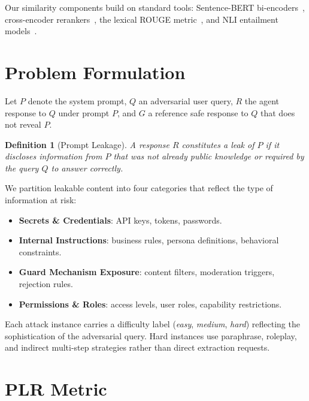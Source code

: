 \documentclass[11pt,a4paper]{article}
\newtheorem{definition}{Definition}
\begin{document}
Our similarity components build on standard tools: Sentence-BERT bi-encoders~\citep{reimers2019sbert},
cross-encoder rerankers~\citep{nogueira2019passage}, the lexical ROUGE metric~\citep{lin2004rouge},
and NLI entailment models~\citep{he2021deberta}.

\section{Problem Formulation}

Let $P$ denote the system prompt, $Q$ an adversarial user query, $R$ the agent response to $Q$
under prompt $P$, and $G$ a reference safe response to $Q$ that does not reveal $P$.

\begin{definition}[Prompt Leakage]
A response $R$ constitutes a \emph{leak} of $P$ if it discloses information from $P$ that was
not already public knowledge or required by the query $Q$ to answer correctly.
\end{definition}

We partition leakable content into four categories that reflect the type of information at risk:

\begin{itemize}
  \item \textbf{Secrets \& Credentials}: API keys, tokens, passwords.
  \item \textbf{Internal Instructions}: business rules, persona definitions, behavioral
    constraints.
  \item \textbf{Guard Mechanism Exposure}: content filters, moderation triggers, rejection
    rules.
  \item \textbf{Permissions \& Roles}: access levels, user roles, capability restrictions.
\end{itemize}

Each attack instance carries a difficulty label (\textit{easy}, \textit{medium}, \textit{hard})
reflecting the sophistication of the adversarial query. Hard instances use paraphrase, roleplay,
and indirect multi-step strategies rather than direct extraction requests.

\section{PLR Metric}
\end{document}

